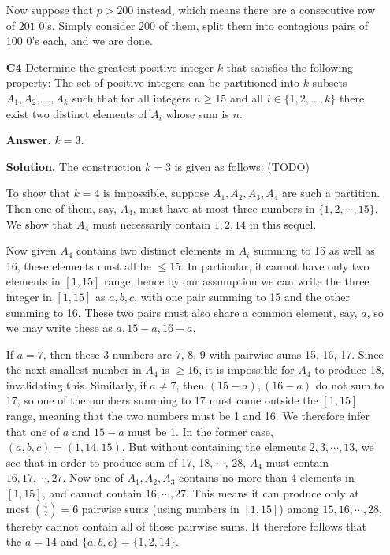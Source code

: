\documentclass[11pt,a4paper]{article}
\begin{document}
\begin{enumerate}
	Now suppose that $p>200$ instead, which means there are a consecutive row of $201$ 0's. Simply consider 200 of them, split them into contagious pairs of 100 0's each, and we are done. 
	
	\item[\textbf{C4}] 
	Determine the greatest positive integer $k$ that satisfies the following property: The set of positive integers can be partitioned into $k$ subsets $A_1, A_2, \ldots, A_k$ such that for all integers $n \geq 15$ and all $i \in \{1, 2, \ldots, k\}$ there exist two distinct elements of $A_i$ whose sum is $n.$
	
	\textbf{Answer.} $k = 3$. 
	
	\textbf{Solution.} The construction $k = 3$ is given as follows: (TODO)
	
	To show that $k = 4$ is impossible, suppose $A_1, A_2, A_3, A_4$ are such a partition. 
	Then one of them, say, $A_4$, must have at most three numbers in $\{1, 2, \cdots, 15\}$. 
	We show that $A_4$ must necessarily contain $1, 2, 14$ in this sequel. 
	
	Now given $A_4$ contains two distinct elements in $A_i$ summing to 15 as well as 16, 
	these elements must all be $\le 15$. 
	In particular, it cannot have only two elements in $[1, 15]$ range, hence by our assumption we can write the three integer in $[1, 15]$ as $a, b, c$, with one pair summing to 15 and the other summing to 16. 
	These two pairs must also share a common element, say, $a$, 
	so we may write these as $a, 15 - a, 16 - a$. 
	
	If $a = 7$, then these 3 numbers are 7, 8, 9 with pairwise sums 15, 16, 17. 
	Since the next smallest number in $A_4$ is $\ge 16$, it is impossible for $A_4$ to produce 18, 
	invalidating this. 
	Similarly, if $a\neq 7$, then $(15 - a), (16 - a)$ do not sum to 17, so one of the numbers summing to 17 must come outside the $[1, 15]$ range, 
	meaning that the two numbers must be 1 and 16. 
	We therefore infer that one of $a$ and $15 - a$ must be 1. 
	In the former case, $(a, b, c) = (1, 14, 15)$. 
	But without containing the elements $2, 3, \cdots, 13$, we see that in order to produce sum of 17, 18, $\cdots$, 28, 
	$A_4$ must contain $16, 17, \cdots, 27$. 
	Now one of $A_1, A_2, A_3$ contains no more than 4 elements in $[1, 15]$, 
	and cannot contain $16, \cdots, 27$. 
	This means it can produce only at most $\binom{4}{2}=6$ pairwise sums (using numbers in $[1, 15]$) among $15, 16, \cdots, 28$, thereby cannot contain all of those pairwise sums. 
	It therefore follows that the $a = 14$ and $\{a, b, c\} = \{1, 2, 14\}$. 
	

\end{enumerate}
\end{document}
